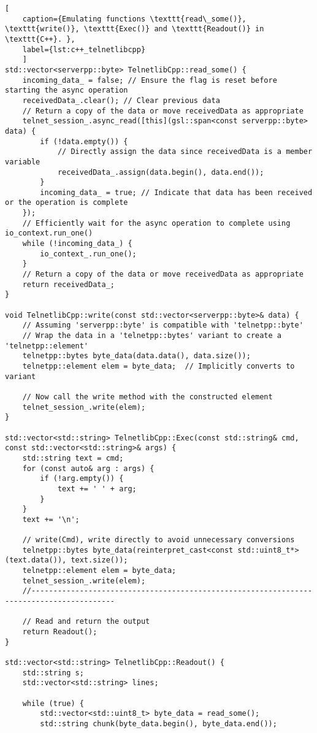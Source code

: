 \begin{lstlisting}[
	caption={Emulating functions \texttt{read\_some()}, \texttt{write()}, \texttt{Exec()} and \texttt{Readout()} in \texttt{C++}. },
	label={lst:c++_telnetlibcpp}
	]
std::vector<serverpp::byte> TelnetlibCpp::read_some() {
	incoming_data_ = false; // Ensure the flag is reset before starting the async operation
	receivedData_.clear(); // Clear previous data
	// Return a copy of the data or move receivedData as appropriate
	telnet_session_.async_read([this](gsl::span<const serverpp::byte> data) {
		if (!data.empty()) {
			// Directly assign the data since receivedData is a member variable
			receivedData_.assign(data.begin(), data.end());
		}
		incoming_data_ = true; // Indicate that data has been received or the operation is complete
	});
	// Efficiently wait for the async operation to complete using io_context.run_one()
	while (!incoming_data_) {
		io_context_.run_one();
	}
	// Return a copy of the data or move receivedData as appropriate
	return receivedData_;
}

void TelnetlibCpp::write(const std::vector<serverpp::byte>& data) {
	// Assuming 'serverpp::byte' is compatible with 'telnetpp::byte'
	// Wrap the data in a 'telnetpp::bytes' variant to create a 'telnetpp::element'
	telnetpp::bytes byte_data(data.data(), data.size());
	telnetpp::element elem = byte_data;  // Implicitly converts to variant
	
	// Now call the write method with the constructed element
	telnet_session_.write(elem);
}

std::vector<std::string> TelnetlibCpp::Exec(const std::string& cmd, const std::vector<std::string>& args) {
	std::string text = cmd;
	for (const auto& arg : args) {
		if (!arg.empty()) {
			text += ' ' + arg;
		}
	}
	text += '\n';
	
	// write(Cmd), write directly to avoid unnecessary conversions 
	telnetpp::bytes byte_data(reinterpret_cast<const std::uint8_t*>(text.data()), text.size());
	telnetpp::element elem = byte_data;
	telnet_session_.write(elem); 
	//-----------------------------------------------------------------------------------------
	
	// Read and return the output
	return Readout();
}

std::vector<std::string> TelnetlibCpp::Readout() {
	std::string s;
	std::vector<std::string> lines;
	
	while (true) {
		std::vector<std::uint8_t> byte_data = read_some();
		std::string chunk(byte_data.begin(), byte_data.end());
		

\end{lstlisting}
